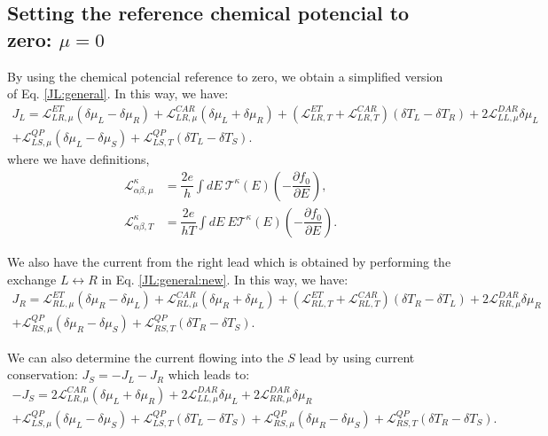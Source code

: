 \subsection{Setting the reference chemical potencial to zero: $\mu=0$}

By using the chemical potencial reference to zero, we obtain a simplified version of Eq. \eqref{JL:general}. In this way, we have:
\begin{multline}\label{JL:general:new}
J_{L}=
\mathcal{L}_{LR,\mu}^{ET}(\delta\mu_{L}-\delta\mu_{R})+
\mathcal{L}_{LR,\mu}^{CAR}\left(\delta\mu_{L}+\delta\mu_{R}\right)
+
(\mathcal{L}_{LR,T}^{ET}+\mathcal{L}_{LR,T}^{CAR})(\delta T_{L}-\delta T_{R})
+
2\mathcal{L}_{LL,\mu}^{DAR}\delta\mu_{L}
\\+
\mathcal{L}^{QP}_{LS,\mu}(\delta\mu_{L}-\delta\mu_{S})
+
\mathcal{L}^{QP}_{LS,T}(\delta T_{L}-\delta T_{S}).
\end{multline}
where we have definitions, 
\begin{align}\label{L:chemical:new}
\mathcal{L}_{\alpha\beta,\mu}^{\kappa}&=\dfrac{2e}{h}\int dE~\mathcal{T}^{\kappa}(E)
\left(-\dfrac{\partial f_{0}}{\partial E}\right),
\\\label{L:temperature:new}
\mathcal{L}_{\alpha\beta,T}^{\kappa}&=\dfrac{2e}{hT}\int dE~E\mathcal{T}^{\kappa}(E)
\left(-\dfrac{\partial f_{0}}{\partial E}\right).
\end{align}

We also have the current from the right lead which is obtained by performing the exchange $L\leftrightarrow R$ in Eq. \eqref{JL:general:new}. In this way, we have:
\begin{multline}\label{JR:general}
J_{R}=
\mathcal{L}_{RL,\mu}^{ET}(\delta\mu_{R}-\delta\mu_{L})+
\mathcal{L}_{RL,\mu}^{CAR}\left(\delta\mu_{R}+\delta\mu_{L}\right)
+
(\mathcal{L}_{RL,T}^{ET}+\mathcal{L}_{RL,T}^{CAR})(\delta T_{R}-\delta T_{L})
+
2\mathcal{L}_{RR,\mu}^{DAR}\delta\mu_{R}
\\+
\mathcal{L}^{QP}_{RS,\mu}(\delta\mu_{R}-\delta\mu_{S})
+
\mathcal{L}^{QP}_{RS,T}(\delta T_{R}-\delta T_{S}).
\end{multline}

We can also determine the current flowing into the $S$ lead by using current conservation: $J_{S}=-J_{L}-J_{R}$ which leads to: 
\begin{multline}\label{JS:general}
-J_{S}=
2\mathcal{L}_{LR,\mu}^{CAR}\left(\delta\mu_{L}+\delta\mu_{R}\right)
+
2\mathcal{L}_{LL,\mu}^{DAR}\delta\mu_{L}
+
2\mathcal{L}_{RR,\mu}^{DAR}\delta\mu_{R}
\\+
\mathcal{L}^{QP}_{LS,\mu}(\delta\mu_{L}-\delta\mu_{S})
+
\mathcal{L}^{QP}_{LS,T}(\delta T_{L}-\delta T_{S})
+
\mathcal{L}^{QP}_{RS,\mu}(\delta\mu_{R}-\delta\mu_{S})
+
\mathcal{L}^{QP}_{RS,T}(\delta T_{R}-\delta T_{S}).
\end{multline}

